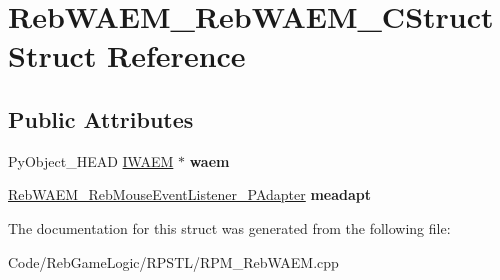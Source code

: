 \hypertarget{struct_reb_w_a_e_m___reb_w_a_e_m___c_struct}{}\section{Reb\+W\+A\+E\+M\+\_\+\+Reb\+W\+A\+E\+M\+\_\+\+C\+Struct Struct Reference}
\label{struct_reb_w_a_e_m___reb_w_a_e_m___c_struct}
\subsection*{Public Attributes}
\begin{DoxyCompactItemize}
\item 
Py\+Object\+\_\+\+H\+E\+AD \hyperlink{class_i_w_a_e_m}{I\+W\+A\+EM} $\ast$ {\bfseries waem}\hypertarget{struct_reb_w_a_e_m___reb_w_a_e_m___c_struct_a378f6a8f633b527ee47ffaf6e2ad58c3}{}\label{struct_reb_w_a_e_m___reb_w_a_e_m___c_struct_a378f6a8f633b527ee47ffaf6e2ad58c3}

\item 
\hyperlink{class_reb_w_a_e_m___reb_mouse_event_listener___p_adapter}{Reb\+W\+A\+E\+M\+\_\+\+Reb\+Mouse\+Event\+Listener\+\_\+\+P\+Adapter} {\bfseries meadapt}\hypertarget{struct_reb_w_a_e_m___reb_w_a_e_m___c_struct_ac1c4cac22458ea0e6226d185dac0d4c9}{}\label{struct_reb_w_a_e_m___reb_w_a_e_m___c_struct_ac1c4cac22458ea0e6226d185dac0d4c9}

\end{DoxyCompactItemize}


The documentation for this struct was generated from the following file\+:\begin{DoxyCompactItemize}
\item 
Code/\+Reb\+Game\+Logic/\+R\+P\+S\+T\+L/R\+P\+M\+\_\+\+Reb\+W\+A\+E\+M.\+cpp\end{DoxyCompactItemize}

